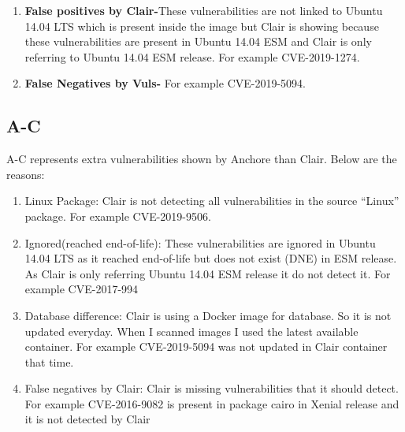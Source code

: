 \documentclass[a4paper,num-refs]{oup-contemporary}
\begin{document}
\begin{enumerate}
\item \textbf{False positives by Clair-}These vulnerabilities are not linked to Ubuntu 14.04 LTS which is 
present inside the image but Clair is showing because these vulnerabilities are present in Ubuntu 14.04 ESM and 
Clair is only referring to Ubuntu 14.04 ESM release. For example CVE-2019-1274.
\item\textbf{False Negatives by Vuls-} For example CVE-2019-5094.
\end{enumerate}

\subsection{A-C}

A-C represents extra vulnerabilities shown by Anchore than Clair. Below are the reasons:
\begin{enumerate}
	\item Linux Package: Clair is not detecting all vulnerabilities in the source “Linux” package. 
		For example CVE-2019-9506.
	\item Ignored(reached end-of-life): These vulnerabilities are ignored in Ubuntu 14.04 LTS as it 
		reached end-of-life but does not exist (DNE) in ESM release. As Clair is only referring 
		Ubuntu 14.04 ESM release it do not detect it. For example CVE-2017-994
	\item Database difference: Clair is using a Docker image for database. So it is not updated everyday. 
		When I scanned images I used the latest available container. For example CVE-2019-5094 was not 
		updated in Clair container that time.
	\item False negatives by Clair: Clair is missing vulnerabilities that it should detect. For example 
		CVE-2016-9082 is present in package cairo in Xenial release and it is not detected by Clair
\end{enumerate}
\end{document}
